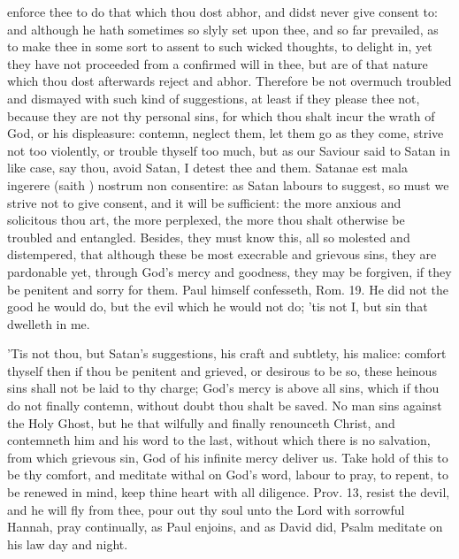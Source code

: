 {enforce thee to do that which thou dost abhor, and didst never give
consent to: and although he hath sometimes so slyly set upon thee, and
so far prevailed, as to make thee in some sort to assent to such wicked
thoughts, to delight in, yet they have not proceeded from a confirmed
will in thee, but are of that nature which thou dost afterwards reject
and abhor. Therefore be not overmuch troubled and dismayed with such
kind of suggestions, at least if they please thee not, because they are
not thy personal sins, for which thou shalt incur the wrath of God, or
his displeasure: contemn, neglect them, let them go as they come,
strive not too violently, or trouble thyself too much, but as our
Saviour said to Satan in like case, say thou, avoid Satan, I detest
thee and them. Satanae est mala ingerere (saith \Austin{}) nostrum non
consentire: as Satan labours to suggest, so must we strive not to give
consent, and it will be sufficient: the more anxious and solicitous
thou art, the more perplexed, the more thou shalt otherwise be troubled
and entangled. Besides, they must know this, all so molested and
distempered, that although these be most execrable and grievous sins,
they are pardonable yet, through God's mercy and goodness, they may be
forgiven, if they be penitent and sorry for them. Paul himself
confesseth, Rom.  19. He did not the good he would do, but the
evil which he would not do; 'tis not I, but sin that dwelleth in me.

'Tis not thou, but Satan's suggestions, his craft and subtlety, his
malice: comfort thyself then if thou be penitent and grieved, or
desirous to be so, these heinous sins shall not be laid to thy charge;
God's mercy is above all sins, which if thou do not finally contemn,
without doubt thou shalt be saved. No man sins against the Holy
Ghost, but he that wilfully and finally renounceth Christ, and
contemneth him and his word to the last, without which there is no
salvation, from which grievous sin, God of his infinite mercy deliver
us. Take hold of this to be thy comfort, and meditate withal on God's
word, labour to pray, to repent, to be renewed in mind, keep thine
heart with all diligence. Prov.  13, resist the devil, and he will
fly from thee, pour out thy soul unto the Lord with sorrowful Hannah,
pray continually, as Paul enjoins, and as David did, Psalm  meditate
on his law day and night.

}
